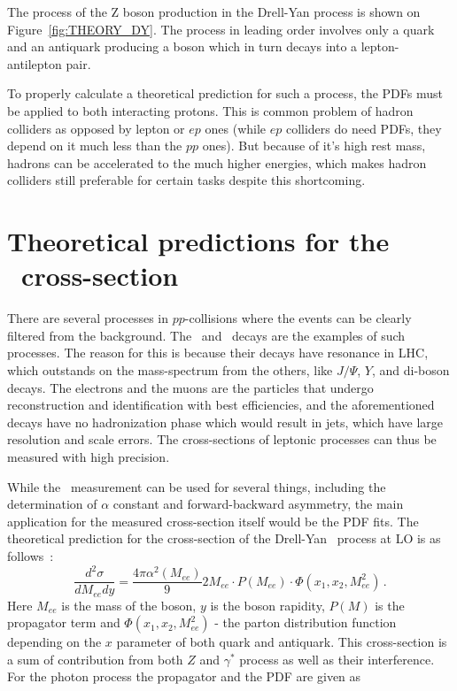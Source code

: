 The process of the Z boson production in the Drell-Yan process is shown on Figure~\ref{fig:THEORY_DY}. The process in leading order involves only a quark and an antiquark producing a boson which in turn decays into a lepton-antilepton pair.

To properly calculate a theoretical prediction for such a process, the PDFs must be applied to both interacting protons. This is common problem of hadron colliders as opposed by lepton or $ep$ ones (while $ep$ colliders do need PDFs, they depend on it much less than the $pp$ ones). But because of it's high rest mass, hadrons can be accelerated to the much higher energies, which makes hadron colliders still preferable for certain tasks despite this shortcoming.

\section{Theoretical predictions for the \Zee\ cross-section}

There are several processes in $pp$-collisions where the events can be clearly filtered from the background. The \Wenu\ and \Zee\ decays are the examples of such processes. The reason for this is because their decays have resonance in LHC, which outstands on the mass-spectrum from the others, like $J/\Psi$, $Y$, and di-boson decays. The electrons and the muons are the particles that undergo reconstruction and identification with best efficiencies, and the aforementioned decays have no hadronization phase which would result in jets, which have large resolution and scale errors. The cross-sections of leptonic processes can thus be measured with high precision.

While the \Zll\ measurement can be used for several things, including the determination of $\alpha$ constant and forward-backward asymmetry, the main application for the measured cross-section itself would be the PDF fits. The theoretical prediction for the cross-section of the Drell-Yan \Zgee\ process at LO is as follows~\cite{lib:theory_Z-c-s}:
\begin{equation}
\label{eq:theory_c-s}
\frac{d^{2}\sigma}{dM_{ee}dy} = \frac{4\pi\alpha^{2}(M_{ee})}{9}2M_{ee}\cdot P(M_{ee})\cdot\Phi(x_{1},x_{2},M^{2}_{ee})\,.
\end{equation}
Here $M_{ee}$ is the mass of the boson, $y$ is the boson rapidity, $P(M)$ is the propagator term and $\Phi(x_{1},x_{2},M^{2}_{ee})$ - the parton distribution function depending on the $x$ parameter of both quark and antiquark. This cross-section is a sum of contribution from both $Z$ and $\gamma^*$ process as well as their interference. For the photon process the propagator and the PDF are given as

